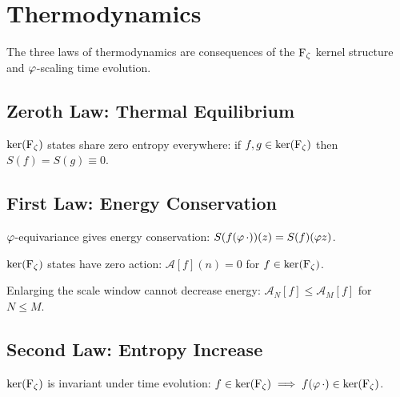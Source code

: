 \chapter{Thermodynamics}
\label{ch:thermo}

The three laws of thermodynamics are consequences of
the $\operatorname{F_\zeta}$ kernel structure and $\varphi$-scaling time evolution.

\section{Zeroth Law: Thermal Equilibrium}

\begin{theorem}
\label{thm:zeroth-law}
$\ker(\operatorname{F_\zeta})$ states share zero entropy everywhere:
if $f,g\in\ker(\operatorname{F_\zeta})$ then $S(f)=S(g)\equiv0$.
\end{theorem}

\section{First Law: Energy Conservation}

\begin{theorem}
\label{thm:first-law}
$\varphi$-equivariance gives energy conservation:
$S(f(\varphi\,\cdot))(z) = S(f)(\varphi z)$.
\end{theorem}

\begin{theorem}
\label{thm:vacuum-energy}
$\ker(\operatorname{F_\zeta})$ states have zero action: $\mathcal{A}[f](n) = 0$ for $f \in \ker(\operatorname{F_\zeta})$.
\end{theorem}

\begin{theorem}
\label{thm:action-monotone}
Enlarging the scale window cannot decrease energy:
$\mathcal{A}_N[f] \le \mathcal{A}_M[f]$ for $N \le M$.
\end{theorem}

\section{Second Law: Entropy Increase}

\begin{theorem}[Reversible]
\label{thm:second-law-reversible}
$\ker(\operatorname{F_\zeta})$ is invariant under time evolution:
$f \in \ker(\operatorname{F_\zeta}) \implies f(\varphi\,\cdot) \in \ker(\operatorname{F_\zeta})$.
\end{theorem}


